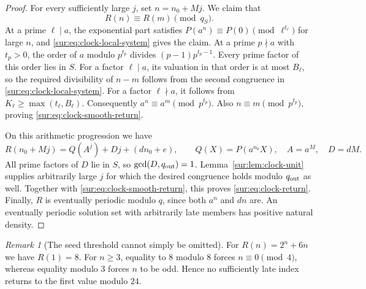 \documentclass[11pt,a4paper]{article}
\theoremstyle{definition}
\theoremstyle{remark}
\newtheorem{remark}[theorem]{Remark}
\numberwithin{equation}{section}
\begin{document}
\begin{proof}
For every sufficiently large $j$, set $n=n_0+Mj$. We claim that
\begin{equation}\label{sur:eq:clock-smooth-return}
 R(n)\equiv R(m)\pmod{q_S}.
\end{equation}
At a prime $\ell\mid a$, the exponential part satisfies
$P(a^n)\equiv P(0)\pmod{\ell^{t_\ell}}$ for large $n$, and
\eqref{sur:eq:clock-local-system} gives the claim. At a prime $p\nmid a$
with $t_p>0$, the order of $a$ modulo $p^{t_p}$ divides
$(p-1)p^{t_p-1}$. Every prime factor of this order lies in $S$.
For a factor $\ell\mid a$, its valuation in that order is at most
$B_\ell$, so the required divisibility of $n-m$ follows from the
second congruence in \eqref{sur:eq:clock-local-system}. For a factor
$\ell\nmid a$, it follows from $K_\ell\ge\max(t_\ell,B_\ell)$.
Consequently $a^n\equiv a^m\pmod{p^{t_p}}$. Also
$n\equiv m\pmod{p^{t_p}}$, proving
\eqref{sur:eq:clock-smooth-return}.

On this arithmetic progression we have
\[
 R(n_0+Mj)=Q(A^j)+Dj+(dn_0+e),\qquad
 Q(X)=P(a^{n_0}X),\quad A=a^M,\quad D=dM.
\]
All prime factors of $D$ lie in $S$, so $\gcd(D,q_{\rm out})=1$.
Lemma~\ref{sur:lem:clock-unit} supplies arbitrarily large $j$ for which
the desired congruence holds modulo $q_{\rm out}$ as well. Together
with \eqref{sur:eq:clock-smooth-return}, this proves
\eqref{sur:eq:clock-return}. Finally, $R$ is eventually periodic modulo
$q$, since both $a^n$ and $dn$ are. An eventually periodic solution
set with arbitrarily late members has positive natural density.
\end{proof}

\begin{remark}[The seed threshold cannot simply be omitted]
For $R(n)=2^n+6n$ we have $R(1)=8$. For $n\ge3$, equality to $8$
modulo $8$ forces $n\equiv0\pmod4$, whereas equality modulo $3$
forces $n$ to be odd. Hence no sufficiently late index returns to the
first value modulo $24$.
\end{remark}
\end{document}
